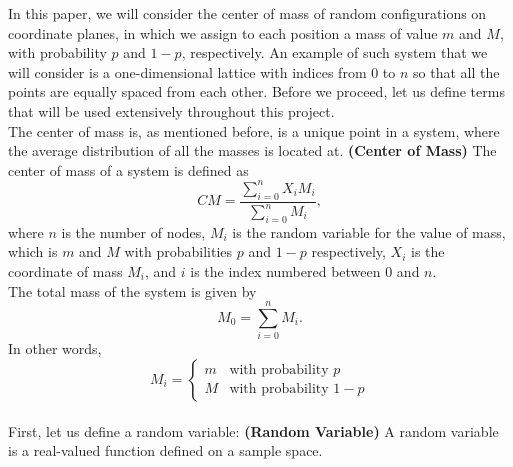 \documentclass[11pt, twoside, reqno]{book}
\begin{document}
In this paper, we will consider the center of mass of random configurations on coordinate planes, in which we assign to each position a mass of value $m$ and $M$, with probability $p$ and $1-p$, respectively. An example of such system that we will consider is a one-dimensional lattice with indices from $0$ to $n$ so that all the points are equally spaced from each other. Before we proceed, let us define terms that will be used extensively throughout this project. \\
The center of mass is, as mentioned before, is a unique point in a system, where the average distribution of all the masses is located at.
\textbf{(Center of Mass)} The center of mass of a system is defined as 
$$CM = \frac{\sum^{n}_{i=0}X_{i}M_{i}}{\sum^{n}_{i=0}M_{i}},$$
where $n$ is the number of nodes, $M_{i}$ is the random variable for the value of mass, which is $m$ and $M$ with probabilities $p$ and $1-p$ respectively, $X_{i}$ is the coordinate of mass $M_{i}$, and $i$ is the index numbered between $0$ and $n$. \\ The total mass of the system is given by 
$$M_{0} = \sum^{n}_{i=0}M_{i}.$$
\edefn
In other words,
\[
M_{i} =
\begin{cases}
m & \text{with probability } p \\
M & \text{with probability } 1-p
\end{cases}
\]
\\
First, let us define a random variable:
\textbf{(Random Variable)} A random variable is a real-valued function defined on a sample space.
\edefn
\end{document}
